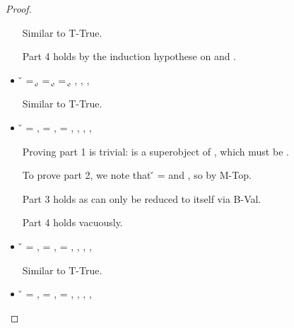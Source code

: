 \begin{lemma}
\begin{proof}
\begin{case}[B-Val]
\begin{itemize}
\begin{subcase}[T-HMap]
        Similar to T-True.

        Part 4 holds by the induction hypothese on {} and {}.
      \end{subcase}
    \item[]
      \begin{subcase}[T-Kw] \v{} = {\k{}},
  \ep{} = {\k{}},
  \e{} = {\k{}},
  \issubtypein{}{\Value{\k{}}}{\t{}},
  \inpropenv{\topprop{}}{\thenprop{\prop{}}},
  \inpropenv{\botprop{}}{\elseprop{\prop{}}},
  \issubtypein{}{\emptyobject{}}{\object{}}

        Similar to T-True.
      \end{subcase}
  \item[] 
    \begin{subcase}[T-False]
      \v{} = \false{},
\ep{} = \false, 
\e{} = \false, 
\issubtypein{}{\False}{\t{}},
\inpropenv{\botprop{}}{\thenprop{\prop{}}},
\inpropenv{\topprop{}}{\elseprop{\prop{}}},
\issubtypein{}{\emptyobject{}}{\object{}}

Proving part 1 is trivial: \object{} is a superobject of \emptyobject{}, which must be \emptyobject{}. 

To prove part 2, we note that \v{} = \false{}
and \inpropenv{\topprop{}}{\elseprop{\prop{}}}, so \satisfies{\openv{}}{\elseprop{\prop{}}} by M-Top. 

Part 3 holds as \e{} can only be reduced to itself via B-Val.

Part 4 holds vacuously.
\end{subcase}
    \item[]
      \begin{subcase}[T-Class] \v{} = {\class{}},
  \ep{} = {\class{}},
  \e{} = {\class{}},
  \issubtypein{}{\Value{\class{}}}{\t{}},
  \inpropenv{\topprop{}}{\thenprop{\prop{}}},
  \inpropenv{\botprop{}}{\elseprop{\prop{}}},
  \issubtypein{}{\emptyobject{}}{\object{}}

        Similar to T-True.
      \end{subcase}
    \item[]
      \begin{subcase}[T-Instance] \v{} = {\classvalue{\classhint{}} {}},
  \ep{} = {\classvalue{\classhint{}} {\overrightarrow {\classfieldpair{\fld{}} {\v{}}}}},
  \e{} = {\classvalue{\classhint{}} {\overrightarrow {\classfieldpair{\fld{}} {\v{}}}}},
  \issubtypein{}{\class{}}{\t{}},
  \inpropenv{\topprop{}}{\thenprop{\prop{}}},
  \inpropenv{\botprop{}}{\elseprop{\prop{}}},
  \issubtypein{}{\emptyobject{}}{\object{}}



\end{subcase}
\end{itemize}
\end{case}
\end{proof}
\end{lemma}
